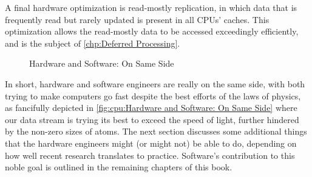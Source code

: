 A final hardware optimization is read-mostly replication, in which
data that is frequently read but rarely updated is present in all
CPUs' caches.
This optimization allows the read-mostly data to be accessed
exceedingly efficiently, and is the subject of
\cref{chp:Deferred Processing}.

\begin{figure}
\centering
{}
\caption{Hardware and Software:
				On Same Side}
\end{figure}

In short, hardware and software engineers are really on the same side,
with both trying to make computers go fast despite the best efforts of
the laws of physics, as fancifully depicted in
\cref{fig:cpu:Hardware and Software: On Same Side}
where our data stream is trying its best to exceed the speed of light,
further hindered by the non-zero sizes of atoms.
The next section discusses some additional things that the hardware engineers
might (or might not) be able to do, depending on how well recent
research translates to practice.
Software's contribution to this noble goal is outlined in the remaining
chapters of this book.
